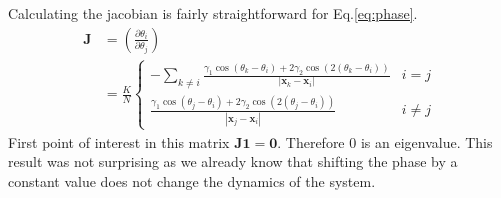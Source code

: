 \documentclass[twocolumn,10pt]{asme2ej}
\begin{document}
{{        Calculating the jacobian is fairly straightforward for Eq.\ref{eq:phase}. 
        \begin{align}
            \mathbf{J} &= \left(\frac{\partial \theta_i}{\partial \theta_j}\right) \nonumber \\
            &= \frac{K}{N}\begin{cases}
                -\sum_{k \neq i} \frac{\gamma_1 \cos\left(\theta_{k}-\theta_{i}\right) + 2 \gamma_2 \cos \left(2 \left(\theta_k -\theta_i\right)\right) }{\left|\mathbf{x}_{k}-\mathbf{x}_{i}\right|} & i = j  \\
                \frac{\gamma_1 \cos\left(\theta_{j}-\theta_{i}\right) + 2 \gamma_2 \cos \left(2 \left(\theta_j -\theta_i\right)\right) }{\left|\mathbf{x}_{j}-\mathbf{x}_{i}\right|} & i \neq j
            \end{cases}
        \end{align}
        First point of interest in this matrix \(\mathbf{J} \mathbf{1} = \mathbf{0}\). Therefore \(0\) is an eigenvalue. This result was not surprising as we already know that shifting the phase by a constant value does not change the dynamics of the system.  

}}
\end{document}
